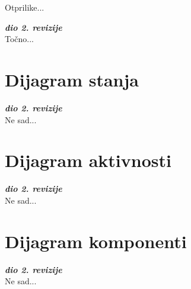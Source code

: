 			Otprilike...
			
			\textbf{\textit{dio 2. revizije}}\\			
			
			Točno...
			
			\eject
		
		\section{Dijagram stanja}
			
			
			\textbf{\textit{dio 2. revizije}}\\
			
			Ne sad...
			
			
			\eject 
		
		\section{Dijagram aktivnosti}
			
			\textbf{\textit{dio 2. revizije}}\\
			
			Ne sad...
			
			\eject
		\section{Dijagram komponenti}
		
			\textbf{\textit{dio 2. revizije}}\\
		
			Ne sad...